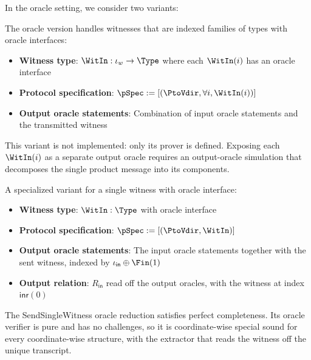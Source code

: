In the oracle setting, we consider two variants:

\begin{definition}
    \label{def:sendwitness_oracle_reduction}
    The oracle version handles witnesses that are indexed families of types with oracle interfaces:
    \begin{itemize}
        \item \textbf{Witness type}: $\WitIn : \iota_w \to \Type$ where each $\WitIn(i)$ has an oracle interface
        \item \textbf{Protocol specification}: $\pSpec := [(\PtoVdir, \forall i, \WitIn(i))]$
        \item \textbf{Output oracle statements}: Combination of input oracle statements and the transmitted witness
    \end{itemize}
    This variant is not implemented: only its prover is defined. Exposing each $\WitIn(i)$ as a separate output oracle requires an output-oracle simulation that decomposes the single product message into its components.
\end{definition}

\begin{definition}
    \label{def:sendsinglewitness_oracle_reduction}
    A specialized variant for a single witness with oracle interface:
    \begin{itemize}
        \item \textbf{Witness type}: $\WitIn : \Type$ with oracle interface
        \item \textbf{Protocol specification}: $\pSpec := [(\PtoVdir, \WitIn)]$
        \item \textbf{Output oracle statements}: The input oracle statements together with the sent witness, indexed by $\iota_{\mathsf{in}} \oplus \Fin(1)$
        \item \textbf{Output relation}: $R_{\mathsf{in}}$ read off the output oracles, with the witness at index $\mathsf{inr}(0)$
    \end{itemize}
    \leanok
\end{definition}

\begin{theorem}
    The SendSingleWitness oracle reduction satisfies perfect completeness. Its oracle verifier is pure and has no challenges, so it is coordinate-wise special sound for every coordinate-wise structure, with the extractor that reads the witness off the unique transcript.
    \leanok
\end{theorem}


